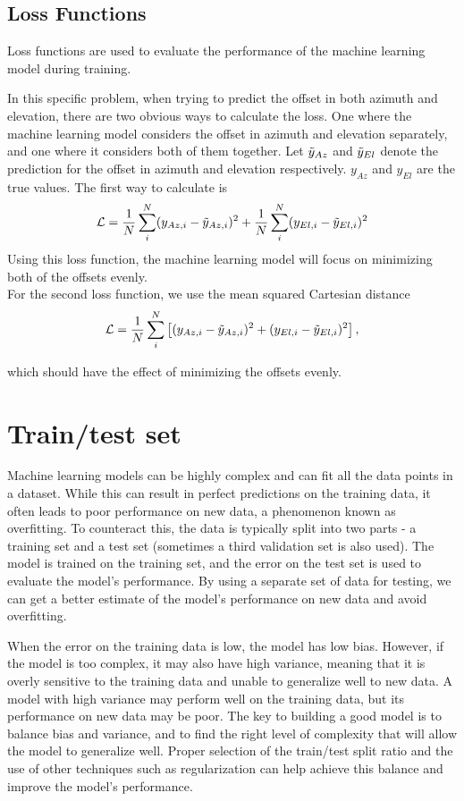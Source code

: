 \subsection{Loss Functions}
Loss functions are used to evaluate the performance of the machine learning model during training.

In this specific problem, when trying to predict the offset in both azimuth and elevation, there are two obvious ways to calculate the loss.
One where the machine learning model considers the offset in azimuth and elevation separately, and one where it considers both of them together.
Let $\Tilde{y}_{Az}$ and $\Tilde{y}_{El}$ denote the prediction for the offset in azimuth and elevation respectively.
$y_{Az}$ and $y_{El}$ are the true values.
The first way to calculate is 
\begin{equation}\label{eq:mse1}
    \mathcal{L} = \frac{1}{N}\sum_i^N (y_{Az,i}-\Tilde{y}_{Az,i})^2 + \frac{1}{N}\sum_i^N (y_{El,i}-\Tilde{y}_{El,i})^2
\end{equation}
Using this loss function, the machine learning model will focus on minimizing both of the offsets evenly.\\

For the second loss function, we use the mean squared Cartesian distance
\begin{equation}\label{eq:totaloff}
    \mathcal{L} = \frac{1}{N}\sum_i^N \left[ (y_{Az,i}-\Tilde{y}_{Az,i})^2 + (y_{El,i}-\Tilde{y}_{El,i})^2 \right],
\end{equation}

which should have the effect of minimizing the offsets evenly.

\section{Train/test set}
Machine learning models can be highly complex and can fit all the data points in a dataset.
While this can result in perfect predictions on the training data, it often leads to poor performance on new data, a phenomenon known as overfitting.
To counteract this, the data is typically split into two parts - a training set and a test set (sometimes a third validation set is also used).
The model is trained on the training set, and the error on the test set is used to evaluate the model's performance.
By using a separate set of data for testing, we can get a better estimate of the model's performance on new data and avoid overfitting.

When the error on the training data is low, the model has low bias.
However, if the model is too complex, it may also have high variance, meaning that it is overly sensitive to the training data and unable to generalize well to new data.
A model with high variance may perform well on the training data, but its performance on new data may be poor.
The key to building a good model is to balance bias and variance, and to find the right level of complexity that will allow the model to generalize well.
Proper selection of the train/test split ratio and the use of other techniques such as regularization can help achieve this balance and improve the model's performance.



